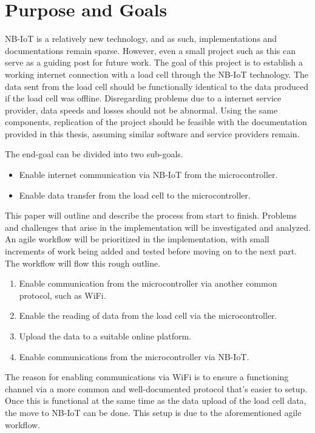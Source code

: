 \section{Purpose and Goals}
\iffalse
\begin{itemize}
	\item Write about the grand scheme of things
	\item Set the correct expectations
	\item What can I expect to learn if I keep on reading?
	\item What are the success criteria for this work?
	\item How will the work be evaluated? %
\end{itemize}
\fi

NB-IoT is a relatively new technology, and as such, implementations and documentations remain sparse.\cite{NB-overview} However, even a small project such as this can serve as a guiding post for future work. The goal of this project is to establish a working internet connection with a load cell through the NB-IoT technology. The data sent from the load cell should be functionally identical to the data produced if the load cell was offline. Disregarding problems due to a internet service provider, data speeds and losses should not be abnormal. Using the same components, replication of the project should be feasible with the documentation provided in this thesis, assuming similar software and service providers remain. 

The end-goal can be divided into two sub-goals. 
\begin{itemize}
	\item Enable internet communication via NB-IoT from the microcontroller.
	\item Enable data transfer from the load cell to the microcontroller.
\end{itemize}

This paper will outline and describe the process from start to finish. Problems and challenges that arise in the implementation will be investigated and analyzed. An agile workflow will be prioritized in the implementation, with small increments of work being added and tested before moving on to the next part. The workflow will flow this rough outline.
\begin{enumerate}
	\item Enable communication from the microcontroller via another common protocol, such as WiFi.
	\item Enable the reading of data from the load cell via the microcontroller.
	\item Upload the data to a suitable online platform.
	\item Enable communications from the microcontroller via NB-IoT.
\end{enumerate}
The reason for enabling communications via WiFi is to ensure a functioning channel via a more common and well-documented protocol that's easier to setup. Once this is functional at the same time as the data upload of the load cell data, the move to NB-IoT can be done. This setup is due to the aforementioned agile workflow.


